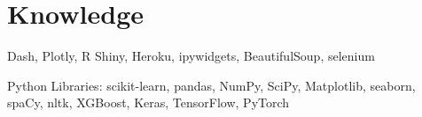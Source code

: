 \documentclass[]{deedy-resume-openfont}
\begin{document}
\begin{minipage}[t]{0.66\textwidth}
\section{Knowledge}

\location{}
\begin{tightemize}
\item Dash, Plotly, R Shiny, Heroku, ipywidgets, BeautifulSoup, selenium
\item Python Libraries: scikit-learn, pandas, NumPy, SciPy, Matplotlib, seaborn, spaCy, nltk, XGBoost, Keras, TensorFlow, PyTorch
\end{tightemize}
\sectionsep



\end{minipage} 
\end{document}

